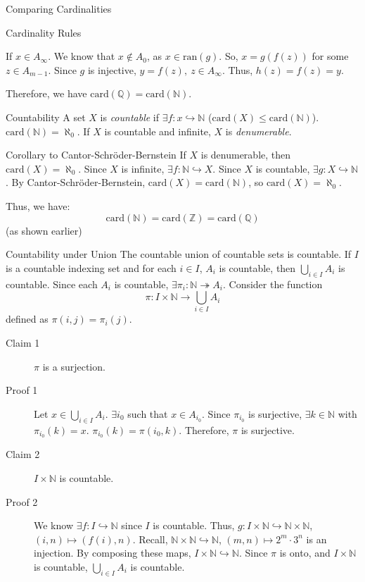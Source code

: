 \documentclass[10pt]{extarticle}
\newcommand{\card}{\text{card}}
\newcommand{\N}{\mathbb{N}}
\newcommand{\Q}{\mathbb{Q}}
\newcommand{\Z}{\mathbb{Z}}
\begin{document}
\begin{problem}{Comparing Cardinalities}
\begin{problem}{Cardinality Rules}
\begin{description}
\begin{description}
              If $x\in A_{\infty}$. We know that $x\notin A_0$, as $x\in \textrm{ran}(g)$. So, $x = g(f(z))$ for some $z\in A_{m-1}$. Since $g$ is injective, $y = f(z),~z\in A_{\infty}$. Thus, $h(z) = f(z) = y$.
          \end{description}
      \end{description}
    \end{problem}
      Therefore, we have $\text{card}(\mathbb{Q}) = \text{card}(\mathbb{N})$.
  \end{problem}
  \begin{problem}{Countability}
    A set $X$ is \textit{countable} if $\exists f: x\hookrightarrow \N$ ($\card(X) \leq\card(\N)$). $\card(\N) = \aleph_0$. If $X$ is countable and infinite, $X$ is \textit{denumerable}.
    \begin{problem}{Corollary to Cantor-Schröder-Bernstein}
      If $X$ is denumerable, then $\card(X) = \aleph_0$.
      \tcblower
      Since $X$ is infinite, $\exists f: \N\hookrightarrow X$. Since $X$ is countable, $\exists g: X\hookrightarrow \N$. By Cantor-Schröder-Bernstein, $\card(X) = \card(\N)$, so $\card(X) = \aleph_0$.
    \end{problem}
    Thus, we have: 
    \[
      \card(\N) = \card(\Z) = \card(\Q)
    \] 
    (as shown earlier)
    \begin{problem}{Countability under Union}
      The countable union of countable sets is countable. If $I$ is a countable indexing set and for each $i\in I$, $A_i$ is countable, then $\bigcup\limits_{i\in I} A_i$ is countable.
      \tcblower
      Since each $A_i$ is countable, $\exists \pi_i: \N \twoheadrightarrow A_i$. Consider the function
      \[
        \pi: I\times\N \rightarrow \bigcup_{i\in I}A_i
      \] 
      defined as $\pi(i,j) = \pi_i(j)$.
      \begin{description}
        \item[Claim 1] $\pi$ is a surjection.
        \item[Proof 1] Let $x\in \bigcup_{i\in I}A_i$. $\exists i_0$ such that $x\in A_{i_0}$. Since $\pi_{i_0}$ is surjective, $\exists k\in \N$ with $\pi_{i_0}(k) = x$. $\pi_{i_0}(k) = \pi(i_0,k)$. Therefore, $\pi$ is surjective.
        \item[Claim 2] $I\times\N$ is countable.
        \item[Proof 2] We know $\exists f: I\hookrightarrow\N$ since $I$ is countable. Thus, $g:I\times\N\hookrightarrow\N\times\N$, $(i,n)\mapsto (f(i),n)$. Recall, $\N\times\N\hookrightarrow \N$, $(m,n)\mapsto 2^m\cdot3^n$ is an injection. By composing these maps, $I\times\N\hookrightarrow\N$. Since $\pi$ is onto, and $I\times\N$ is countable, $\bigcup_{i\in I} A_i$ is countable.
      \end{description}
    \end{problem}
  \end{problem}
\end{document}
